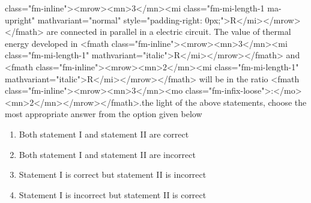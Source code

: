 \documentclass{article}
\begin{document}
class="fm-inline"><mrow><mn>3</mn><mi class="fm-mi-length-1 ma-upright" mathvariant="normal" style="padding-right: 0px;">R</mi></mrow></fmath> are connected in parallel in a electric circuit. The value of thermal energy developed in <fmath class="fm-inline"><mrow><mn>3</mn><mi class="fm-mi-length-1" mathvariant="italic">R</mi></mrow></fmath> and <fmath class="fm-inline"><mrow><mn>2</mn><mi class="fm-mi-length-1" mathvariant="italic">R</mi></mrow></fmath> will be in the ratio <fmath class="fm-inline"><mrow><mn>3</mn><mo class="fm-infix-loose">:</mo><mn>2</mn></mrow></fmath>.\newlineIn the light of the above statements, choose the most appropriate answer from the option given below 
\begin{enumerate}[label=(\alph*)]
\item  Both statement I and statement II are correct 
\item  Both statement I and statement II are incorrect 
\item  Statement I is correct but statement II is incorrect 
\item  Statement I is incorrect but statement II is correct
\end{enumerate}
\newpage
\end{document}
